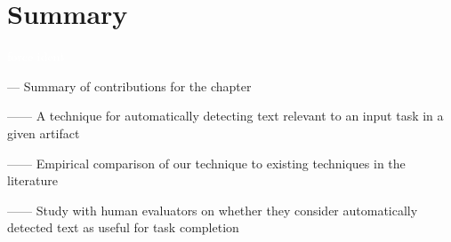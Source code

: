 







\clearpage

\section{Summary}
\textcolor{white}{force ident} %

--- Summary of contributions for the chapter \vspace{3mm}

------ A technique for automatically detecting text relevant to an input task in a given artifact

------ Empirical comparison of our technique to existing techniques in the literature

------ Study with human evaluators on whether they consider automatically detected text as useful for task completion

